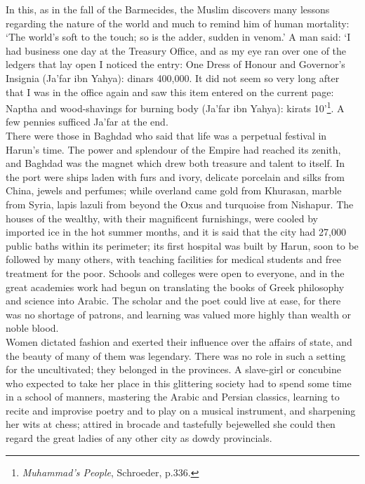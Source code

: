 \documentclass[10pt, twoside,openright]{book}
\begin{document}
In this, as in the fall of the Barmecides, the Muslim discovers many lessons regarding the nature of 
the world and much to remind him of human mortality: `The world's soft to the touch; so is the adder, 
sudden in venom.' A man said: `I had business one day at the Treasury Office, and as my eye ran over 
one of the ledgers that lay open I noticed the entry: One Dress of Honour and Governor's Insignia 
(Ja'far ibn Yahya): dinars 400,000. It did not seem so very long after that I was in the office again 
and saw this item entered on the current page: Naptha and wood\hyp{}shavings for burning body (Ja'far ibn 
Yahya): kirats 10'\footnote{\emph{Muhammad's People}, Schroeder, p.336.}. A few pennies sufficed Ja'far at the end. \\

There were those in Baghdad who said that life was a perpetual festival in Harun's time. The power 
and splendour of the Empire had reached its zenith, and Baghdad was the magnet which drew both 
treasure and talent to itself. In the port were ships laden with furs and ivory, delicate porcelain 
and silks from China, jewels and perfumes; while overland came gold from Khurasan, marble from Syria, 
lapis lazuli from beyond the Oxus and turquoise from Nishapur. The houses of the wealthy, with their 
magnificent furnishings, were cooled by imported ice in the hot summer months, and it is said that 
the city had 27,000 public baths within its perimeter; its first hospital was built by Harun, soon to 
be followed by many others, with teaching facilities for medical students and free treatment for the 
poor. Schools and colleges were open to everyone, and in the great academies work had begun on 
translating the books of Greek philosophy and science into Arabic. The scholar and the poet could 
live at ease, for there was no shortage of patrons, and learning was valued more highly than wealth 
or noble blood. \\

Women dictated fashion and exerted their influence over the affairs of state, and the beauty of many 
of them was legendary. There was no role in such a setting for the uncultivated; they belonged in the 
provinces. A slave\hyp{}girl or concubine who expected to take her place in this glittering society had to 
spend some time in a school of manners, mastering the Arabic and Persian classics, learning to recite 
and improvise poetry and to play on a musical instrument, and sharpening her wits at chess; attired 
in brocade and tastefully bejewelled she could then regard the great ladies of any other city as 
dowdy provincials. \\
\end{document}
